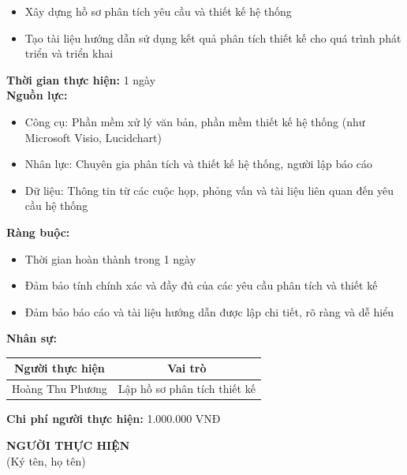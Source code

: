 {\begin{minipage}{\textwidth}
\begin{itemize}
        \item Xây dựng hồ sơ phân tích yêu cầu và thiết kế hệ thống
        \item Tạo tài liệu hướng dẫn sử dụng kết quả phân tích thiết kế cho quá trình phát triển và triển khai
    \end{itemize}
    \vspace{0.5cm}
    \noindent \textbf{Thời gian thực hiện:} 1 ngày \\
    \noindent \textbf{Nguồn lực:}
    \begin{itemize}
        \item Công cụ: Phần mềm xử lý văn bản, phần mềm thiết kế hệ thống (như Microsoft Visio, Lucidchart)
        \item Nhân lực: Chuyên gia phân tích và thiết kế hệ thống, người lập báo cáo
        \item Dữ liệu: Thông tin từ các cuộc họp, phỏng vấn và tài liệu liên quan đến yêu cầu hệ thống
    \end{itemize}
    \vspace{0.5cm}
    \noindent \textbf{Ràng buộc:}
    \begin{itemize}
        \item Thời gian hoàn thành trong 1 ngày
        \item Đảm bảo tính chính xác và đầy đủ của các yêu cầu phân tích và thiết kế
        \item Đảm bảo báo cáo và tài liệu hướng dẫn được lập chi tiết, rõ ràng và dễ hiểu
    \end{itemize}
    \vspace{0.5cm}
    \noindent \textbf{Nhân sự:}
    \begin{longtable}{|c|c|}
    \hline
    \textbf{Người thực hiện} & \textbf{Vai trò} \\
    \hline
    Hoàng Thu Phương & Lập hồ sơ phân tích thiết kế \\
    \hline
    \end{longtable}
    \vspace{0.5cm}
    \noindent \textbf{Chi phí người thực hiện:} 1.000.000 VNĐ
    \vspace{1cm}
    \begin{flushleft}
        \hspace{8cm} \textbf{NGƯỜI THỰC HIỆN} \\
        \hspace{8.8cm} (Ký tên, họ tên) \\
        \vspace{1cm}
    \end{flushleft}
    \end{minipage}
}
%
